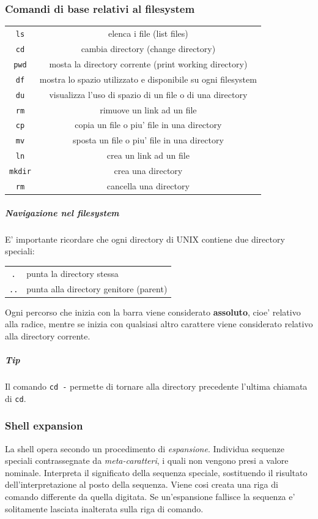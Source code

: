 \subsubsection{Comandi di base relativi al filesystem} 
\begin{center}
	\begin{tabular}{c|c}
		\hline
		\texttt{ls} & elenca i file (list files)\\ 
		\texttt{cd} & cambia directory (change directory)\\ 
		\texttt{pwd} & mosta la directory corrente (print working directory)\\ 
		\texttt{df} & mostra lo spazio utilizzato e disponibile su ogni filesystem\\ 
		\texttt{du} & visualizza l'uso di spazio di un file o di una directory\\ 
		\texttt{rm} & rimuove un link ad un file \\ 
		\texttt{cp} & copia un file o piu' file in una directory \\ 
		\texttt{mv} & sposta un file o piu' file in una directory \\ 
		\texttt{ln} & crea un link ad un file \\ 
		\texttt{mkdir} & crea una directory \\ 
		\texttt{rm} & cancella una directory \\ 
		\hline
	\end{tabular}
\end{center}
\subparagraph{Navigazione nel filesystem}
E' importante ricordare che ogni directory di UNIX contiene due directory speciali:
\begin{center}
	\begin{tabular}{cl}
		\texttt{.} & punta la directory stessa \\ 
		\texttt{..} & punta alla directory genitore (parent) \\ 
	\end{tabular}
\end{center}
Ogni percorso che inizia con la barra viene considerato \textbf{assoluto}, cioe' relativo
alla radice, mentre se inizia con qualsiasi altro carattere viene considerato relativo
alla directory corrente.

\subparagraph{\textbf{Tip}}
	Il comando \texttt{cd -} permette di tornare alla directory precedente l'ultima chiamata di \texttt{cd}.

\subsubsection{Shell expansion}
La shell opera secondo un procedimento di \emph{espansione}. Individua sequenze speciali
contrassegnate da \emph{meta-caratteri}, i quali non vengono presi a valore nominale.
Interpreta il significato della sequenza speciale, sostituendo il risultato 
dell'interpretazione al posto della sequenza. Viene cosi creata una riga di comando
differente da quella digitata. Se un'espansione fallisce la sequenza e' solitamente
lasciata inalterata sulla riga di comando.

